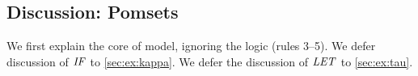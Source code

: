 





\subsection{Discussion: Pomsets}
\label{sec:ex:pomset}

We first explain the core of model, ignoring the logic (rules 3--5).  We
defer discussion of $\sIF{}$ to \textsection\ref{sec:ex:kappa}.  We defer the
discussion of $\sLET{}{}$ to \textsection\ref{sec:ex:tau}.


